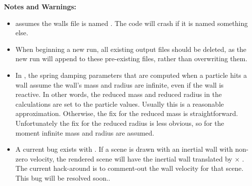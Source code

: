 \textbf{Notes and Warnings:}
\begin{itemize}
\item {} assumes the walls file is
  named .  The code will crash if it is named
  something else.
\item When beginning a new run, all existing  output
  files should be deleted, as the new run will append to these
  pre-existing files, rather than overwriting them.
\item In , the spring damping parameters
  that are computed when a particle hits a wall assume the wall's mass
  and radius are infinite, even if the wall is reactive.  In other
  words, the reduced mass and reduced radius in the calculations are
  set to the particle values.  Usually this is a reasonable
  approximation.  Otherwise, the fix for the reduced mass is
  straightforward.  Unfortunately the fix for the reduced radius is
  less obvious, so for the moment infinite mass and radius are
  assumed.
\item A current bug exists with .  If a scene is drawn
  with an inertial wall with non-zero velocity, the rendered scene
  will have the inertial wall translated by  $\times$
  .  The current hack-around is to comment-out the wall
  velocity for that scene.  This bug will be resolved soon..
\end{itemize}


